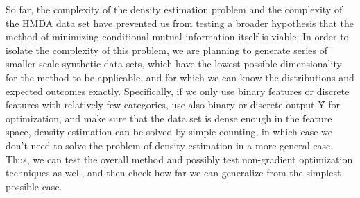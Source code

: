 So far, the complexity of the density estimation problem and the complexity of
the HMDA data set have prevented us from testing a broader hypothesis that the
method of minimizing conditional mutual information itself is viable. In order to
isolate the complexity of this problem, we are planning to generate series of
smaller-scale synthetic data sets, which have the lowest possible dimensionality
for the method to be applicable, and for which we can know the distributions and
expected outcomes exactly. Specifically, if we only use binary features or
discrete features with relatively few categories, use also binary or
discrete output $Ŷ$ for optimization, and make sure that the data set is dense
enough in the feature space, density estimation can be solved by simple counting,
in which case we don't need to solve the problem of density estimation in a 
more general case. Thus, we can test the overall method and possibly test
non-gradient optimization techniques as well, and then check how far we can
generalize from the simplest possible case.
